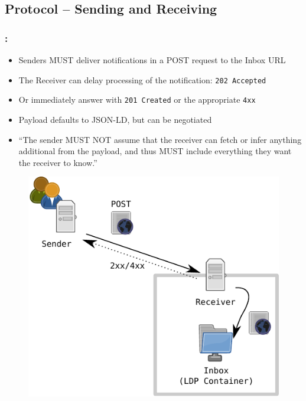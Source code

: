 \documentclass[aspectratio=169,hideallsubsections]{beamer}
\begin{document}
\subsection{Protocol – Sending and Receiving}
\begin{frame}
  \frametitle{\insertsection: \insertsubsection}%

  \begin{itemize}
   \item Senders MUST deliver notifications in a POST request to the Inbox URL
   \item The Receiver can delay processing of the notification: \texttt{202 Accepted}
   \item Or immediately answer with \texttt{201 Created} or the appropriate \texttt{4xx}
   \item Payload defaults to JSON-LD, but can be negotiated
   \item “The sender MUST NOT assume that the receiver can fetch or infer anything additional from the payload, and thus MUST include everything they want the receiver to know.”
  \end{itemize}

  
    \begin{figure}
     \begin{center}
     \includegraphics[width=.25\textwidth]{LingedDataNotifications/LDN-overview-sending}
     \end{center}
    \end{figure}

\end{frame}
\end{document}
